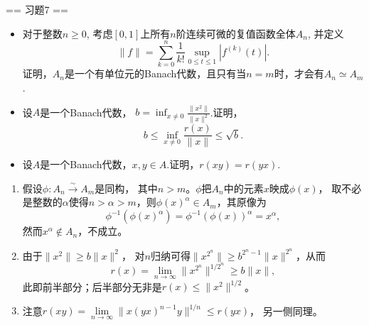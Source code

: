 == 习题7 ==
\begin{itemize}
	\item[1]对于整数$n \geqslant 0$, 考虑$[0,1]$上所有$n$阶连续可微的复值函数全体$A_n$, 并定义
	$$\|f\|=\sum_{k=0}^{n}\frac{1}{k!}\sup_{0 \leqslant t \leqslant 1}|f^{(k)}(t)|.$$
	证明，$A_n$是一个有单位元的Banach代数，且只有当$n=m$时，才会有$A_n \simeq A_m$.
	\item[2]设$A$是一个Banach代数，
	$b=\displaystyle \inf_{x \neq 0}\frac{\|x^2\|}{\|x\|^2}$.证明，
	$$b\leqslant \inf_{x \neq 0}\frac{r(x)}{\|x\|} \leqslant \sqrt{b}.$$
    \item[3]设$A$是一个Banach代数，$x, y \in A$.证明，$r(xy)=r(yx)$.
\end{itemize}
\begin{proofc}
\begin{enumerate}
    \item 假设$\phi\colon A_n\stackrel{\sim}{\longrightarrow}A_m$是同构，
    其中$n>m$。$\phi$把$A_n$中的元素$x$映成$\phi(x)$，
    取不必是整数的$\alpha$使得$n>\alpha>m$，则$\phi(x)^\alpha \in A_m$，其原像为
    \[\phi^{-1}(\phi(x)^\alpha)=\phi^{-1}(\phi(x))^\alpha=x^\alpha,\]
    然而$x^\alpha \notin A_n$，不成立。
    \item 由于$\|x^2\| \geqslant b\|x\|^2$，
    对$n$归纳可得$\|x^{2^n}\| \geqslant b^{2^n-1}\|x\|^{2^n}$，从而
    \[r(x)=\lim_{n\to\infty}\|x^{2^n}\|^{1/2^n} \geqslant b\|x\|,\]
    此即前半部分；后半部分无非是$r(x)\leqslant\|x^2\|^{1/2}$。
    \item 注意$r(xy)=\lim\limits_{n\to\infty}\|x(yx)^{n-1}y\|^{1/n} \leqslant r(yx)$，
    另一侧同理。\qedhere
\end{enumerate}
\end{proofc}

